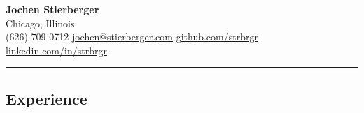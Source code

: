 \documentclass[11pt,letterpaper]{article}
\begin{document}
\begin{center}
	{\Large \textbf{Jochen Stierberger}}\\
	Chicago, Illinois
	\vspace{0.05cm}
	\\
	(626) 709-0712 \hfill
	\href{mailto:jochen@stierberger.com}{jochen@stierberger.com} \hfill
	\href{https://github.com/strbrgr}{github.com/strbrgr} \hfill
	\href{https://linkedin.com/in/strbrgr}{linkedin.com/in/strbrgr}
\end{center}
\vspace{1em} %
%
%
\hrule
\vspace{-1em}
\subsection*{\Large Experience}
\end{document}
